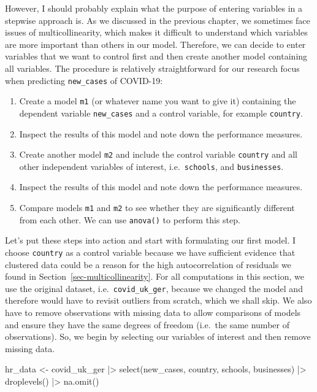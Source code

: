 \documentclass[
  letterpaper,
]{krantz}
\makeatletter
\newenvironment{Shaded}{\begin{snugshade}}{\end{snugshade}}
\newcommand{\FunctionTok}[1]{\textcolor[rgb]{0.28,0.35,0.67}{#1}}
\newcommand{\NormalTok}[1]{\textcolor[rgb]{0.00,0.23,0.31}{#1}}
\newcommand{\OtherTok}[1]{\textcolor[rgb]{0.00,0.23,0.31}{#1}}
\newcommand{\SpecialCharTok}[1]{\textcolor[rgb]{0.37,0.37,0.37}{#1}}
\providecommand{\tightlist}{%
  \setlength{\itemsep}{0pt}\setlength{\parskip}{0pt}}\usepackage{longtable,booktabs,array}
\newenvironment{kframe}{%
\medskip{}
\setlength{\fboxsep}{.8em}
 \def\at@end@of@kframe{}%
 \ifinner\ifhmode%
  \def\at@end@of@kframe{\end{minipage}}%
  \begin{minipage}{\columnwidth}%
 \fi\fi%
 \def\FrameCommand##1{\hskip\@totalleftmargin \hskip-\fboxsep
 \colorbox{shadecolor}{##1}\hskip-\fboxsep
     \hskip-\linewidth \hskip-\@totalleftmargin \hskip\columnwidth}%
 \MakeFramed {\advance\hsize-\width
   \@totalleftmargin\z@ \linewidth\hsize
   \@setminipage}}%
 {\par\unskip\endMakeFramed%
 \at@end@of@kframe}
\renewenvironment{Shaded}{\begin{kframe}}{\end{kframe}}
\makeatother
\begin{document}
However, I should probably explain what the purpose of entering
variables in a stepwise approach is. As we discussed in the previous
chapter, we sometimes face issues of multicollinearity, which makes it
difficult to understand which variables are more important than others
in our model. Therefore, we can decide to enter variables that we want
to control first and then create another model containing all variables.
The procedure is relatively straightforward for our research focus when
predicting \texttt{new\_cases} of COVID-19:

\begin{enumerate}
\def\labelenumi{\arabic{enumi}.}
\tightlist
\item
  Create a model \texttt{m1} (or whatever name you want to give it)
  containing the dependent variable \texttt{new\_cases} and a control
  variable, for example \texttt{country}.
\item
  Inspect the results of this model and note down the performance
  measures.
\item
  Create another model \texttt{m2} and include the control variable
  \texttt{country} and all other independent variables of interest,
  i.e.~\texttt{schools}, and \texttt{businesses}.
\item
  Inspect the results of this model and note down the performance
  measures.
\item
  Compare models \texttt{m1} and \texttt{m2} to see whether they are
  significantly different from each other. We can use \texttt{anova()}
  to perform this step.
\end{enumerate}

Let's put these steps into action and start with formulating our first
model. I choose \texttt{country} as a control variable because we have
sufficient evidence that clustered data could be a reason for the high
autocorrelation of residuals we found in
Section~\ref{sec-multicollinearity}. For all computations in this
section, we use the original dataset, i.e.~\texttt{covid\_uk\_ger},
because we changed the model and therefore would have to revisit
outliers from scratch, which we shall skip. We also have to remove
observations with missing data to allow comparisons of models and ensure
they have the same degrees of freedom (i.e.~the same number of
observations). So, we begin by selecting our variables of interest and
then remove missing data.

\begin{Shaded}
\begin{Highlighting}[]
\NormalTok{hr\_data }\OtherTok{\textless{}{-}}
\NormalTok{  covid\_uk\_ger }\SpecialCharTok{|\textgreater{}}
  \FunctionTok{select}\NormalTok{(new\_cases, country, schools, businesses) }\SpecialCharTok{|\textgreater{}}
  \FunctionTok{droplevels}\NormalTok{() }\SpecialCharTok{|\textgreater{}}
  \FunctionTok{na.omit}\NormalTok{()}
\end{Highlighting}
\end{Shaded}
\end{document}
